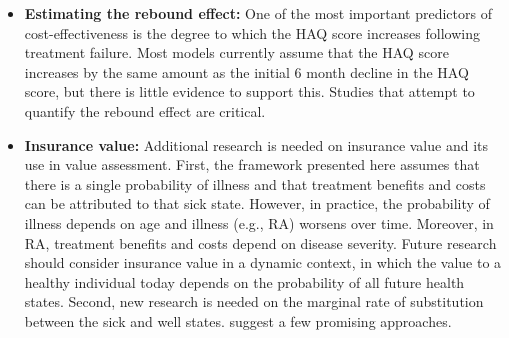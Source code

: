 \documentclass[11pt,final,fleqn]{article}\usepackage[]{graphicx}\usepackage[]{color}
\theoremstyle{plain}
\begin{document}
\begin{itemize}
\item \textbf{Estimating the rebound effect:} One of the most important predictors of cost-effectiveness is the degree to which the HAQ score increases following treatment failure. Most models currently assume that the HAQ score increases by the same amount as the initial 6 month decline in the HAQ score, but there is little evidence to support this. Studies that attempt to quantify the rebound effect are critical. 
\item \textbf{Insurance value:} Additional research is needed on insurance value and its use in value assessment. First, the framework presented here assumes that there is a single probability of illness and that treatment benefits and costs can be attributed to that sick state. However, in practice, the probability of illness depends on age and illness (e.g., RA) worsens over time. Moreover, in RA, treatment benefits and costs depend on disease severity. Future research should consider insurance value in a dynamic context, in which the value to a healthy individual today depends on the probability of all future health states. Second, new research is needed on the marginal rate of substitution between the sick and well states. \citet{lakdawalla2017insurance} suggest a few promising approaches.     
\end{itemize}
\end{document}

